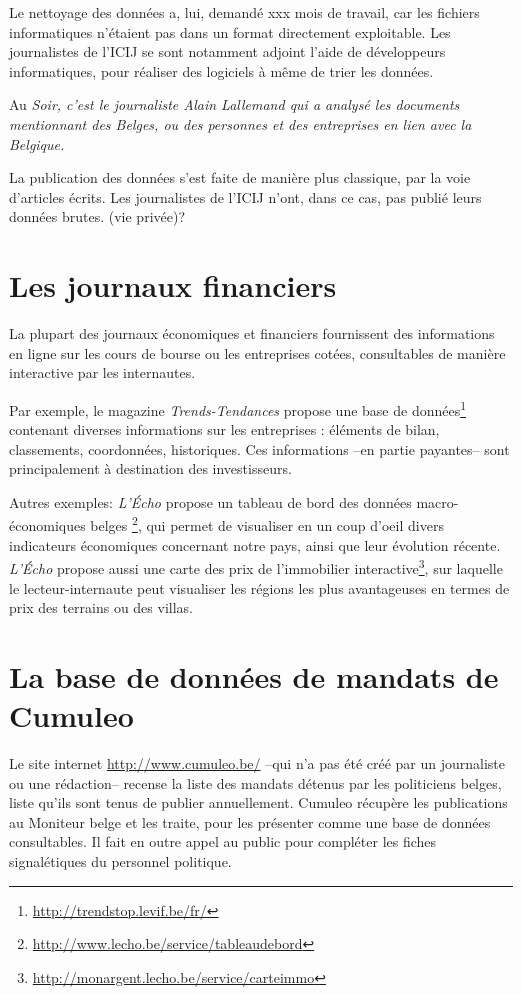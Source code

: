 Le nettoyage des données a, lui, demandé xxx mois de travail, car les fichiers informatiques n'étaient pas dans un format directement exploitable. Les journalistes de l'ICIJ se sont notamment adjoint l'aide de développeurs informatiques, pour réaliser des logiciels à même de trier les données.

Au \em Soir\em, c'est le journaliste Alain Lallemand qui a analysé les documents mentionnant des Belges, ou des personnes et des entreprises en lien avec la Belgique.

La publication des données s'est faite de manière plus classique, par la voie d'articles écrits. Les journalistes de l'ICIJ n'ont, dans ce cas, pas publié leurs données brutes. (vie privée)?

\section{Les journaux financiers}

La plupart des journaux économiques et financiers fournissent des informations en ligne 
sur les cours de bourse ou les entreprises cotées, consultables de manière interactive par les internautes.

Par exemple, le magazine \textit{Trends-Tendances} propose une base de données\footnote{\url{http://trendstop.levif.be/fr/}} contenant diverses informations sur les entreprises : éléments de bilan, classements, coordonnées, historiques. Ces informations --en partie payantes-- sont principalement à destination des investisseurs. 

Autres exemples: \textit{L'Écho} propose un \og tableau de bord des données macro-économiques belges \fg\footnote{\url{http://www.lecho.be/service/tableaudebord}}, qui permet de visualiser en un coup d'oeil divers indicateurs économiques concernant notre pays, ainsi que leur évolution récente. \textit{L'Écho} propose aussi une carte des prix de l'immobilier interactive\footnote{\url{http://monargent.lecho.be/service/carteimmo}}, sur laquelle le lecteur-internaute peut visualiser les régions les plus avantageuses en termes de prix des terrains ou des villas.

\section{La base de données de mandats de Cumuleo}

Le site internet \url{http://www.cumuleo.be/} --qui n'a pas été créé par un journaliste 
ou une rédaction-- 
recense la liste des mandats détenus par 
les politiciens belges, liste qu'ils sont tenus de publier annuellement. Cumuleo 
récupère les publications au Moniteur belge et les traite, pour les présenter comme une  
base de données consultables. Il fait en outre appel au public pour compléter les fiches 
signalétiques du personnel politique. 

